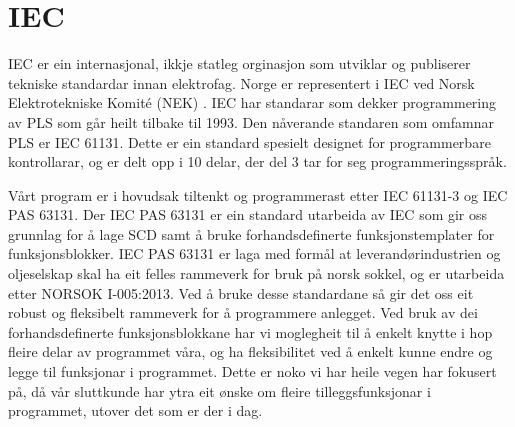 \section{IEC}
\thispagestyle{fancy}
\label{sec:5.2}


\gls{IEC} \citep{IEC} er ein internasjonal, ikkje statleg orginasjon som utviklar og publiserer tekniske standardar innan elektrofag. 
Norge er representert i IEC ved Norsk Elektrotekniske Komité (NEK) \citep{IEC-SNL}. 
IEC har standarar som dekker programmering av PLS som går heilt tilbake til 1993\citep{Wiki-93}. 
Den nåverande standaren som omfamnar PLS er IEC 61131\citep{IEC-61131}. Dette er ein standard spesielt designet for programmerbare kontrollarar, og er delt opp i 10 delar, der del 3 tar for seg programmeringsspråk. 

Vårt program er i hovudsak tiltenkt og programmerast etter IEC 61131-3 og IEC \gls{PAS} 63131\citep{IEC-63131}. 
Der IEC PAS 63131 er ein standard utarbeida av IEC som gir oss grunnlag for å lage \gls{SCD} samt å bruke forhandsdefinerte funksjonstemplater for funksjonsblokker. 
IEC PAS 63131 er laga med formål at leverandørindustrien og oljeselskap skal ha eit felles rammeverk for bruk på norsk sokkel, og er utarbeida etter NORSOK I-005:2013.
Ved å bruke desse standardane så gir det oss eit robust og fleksibelt rammeverk for å programmere anlegget. 
Ved bruk av dei forhandsdefinerte funksjonsblokkane har vi moglegheit til å enkelt knytte i hop fleire delar av programmet våra, og ha fleksibilitet ved å enkelt kunne endre og legge til funksjonar i programmet. 
Dette er noko vi har heile vegen har fokusert på, då vår sluttkunde har ytra eit ønske om fleire tilleggsfunksjonar i programmet, utover det som er der i dag. 
\newpage
